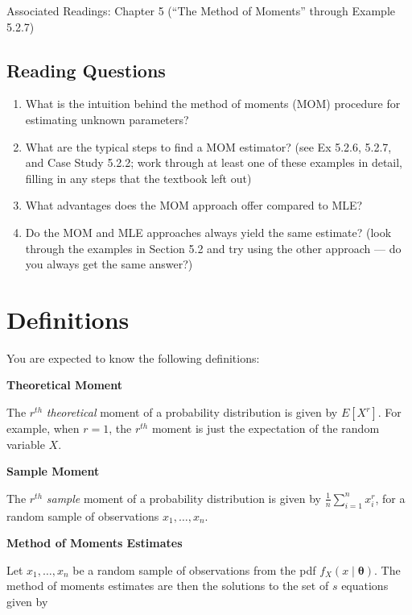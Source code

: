 \documentclass[
  letterpaper,
  DIV=11,
  numbers=noendperiod]{scrreprt}
\begin{document}
Associated Readings: Chapter 5 (``The Method of Moments'' through
Example 5.2.7)

\hypertarget{reading-questions-2}{%
\subsection{Reading Questions}\label{reading-questions-2}}

\begin{enumerate}
\def\labelenumi{\arabic{enumi}.}
\item
  What is the intuition behind the method of moments (MOM) procedure for
  estimating unknown parameters?
\item
  What are the typical steps to find a MOM estimator? (see Ex 5.2.6,
  5.2.7, and Case Study 5.2.2; work through at least one of these
  examples in detail, filling in any steps that the textbook left out)
\item
  What advantages does the MOM approach offer compared to MLE?
\item
  Do the MOM and MLE approaches always yield the same estimate? (look
  through the examples in Section 5.2 and try using the other approach
  --- do you always get the same answer?)
\end{enumerate}

\hypertarget{definitions-2}{%
\section{Definitions}\label{definitions-2}}

You are expected to know the following definitions:

\textbf{Theoretical Moment}

The \(r^{th}\) \emph{theoretical} moment of a probability distribution
is given by \(E[X^r]\). For example, when \(r = 1\), the \(r^{th}\)
moment is just the expectation of the random variable \(X\).

\textbf{Sample Moment}

The \(r^{th}\) \emph{sample} moment of a probability distribution is
given by \(\frac{1}{n} \sum_{i = 1}^n x_i^r\), for a random sample of
observations \(x_1, \dots, x_n\).

\textbf{Method of Moments Estimates}

Let \(x_1, \dots, x_n\) be a random sample of observations from the pdf
\(f_X(x \mid \boldsymbol{\theta})\). The method of moments estimates are
then the solutions to the set of \(s\) equations given by
\end{document}

